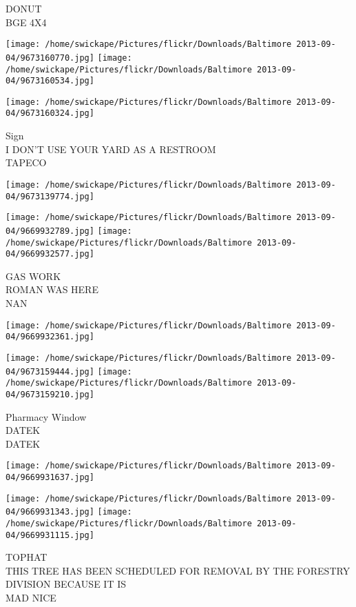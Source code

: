 \documentclass[10pt,letterpaper]{article}
\begin{document}
DONUT\\
BGE 4X4
\pagebreak

\texttt{[image: /home/swickape/Pictures/flickr/Downloads/Baltimore 2013-09-04/9673160770.jpg]}
\texttt{[image: /home/swickape/Pictures/flickr/Downloads/Baltimore 2013-09-04/9673160534.jpg]}

\vspace{0.25in}
\texttt{[image: /home/swickape/Pictures/flickr/Downloads/Baltimore 2013-09-04/9673160324.jpg]}

Sign\\
I DON'T USE YOUR YARD AS A RESTROOM\\
TAPECO
\pagebreak

\texttt{[image: /home/swickape/Pictures/flickr/Downloads/Baltimore 2013-09-04/9673139774.jpg]}

\vspace{0.25in}
\texttt{[image: /home/swickape/Pictures/flickr/Downloads/Baltimore 2013-09-04/9669932789.jpg]}
\texttt{[image: /home/swickape/Pictures/flickr/Downloads/Baltimore 2013-09-04/9669932577.jpg]}

GAS WORK\\
ROMAN WAS HERE\\
NAN
\pagebreak

\texttt{[image: /home/swickape/Pictures/flickr/Downloads/Baltimore 2013-09-04/9669932361.jpg]}

\vspace{0.25in}
\texttt{[image: /home/swickape/Pictures/flickr/Downloads/Baltimore 2013-09-04/9673159444.jpg]}
\texttt{[image: /home/swickape/Pictures/flickr/Downloads/Baltimore 2013-09-04/9673159210.jpg]}

Pharmacy Window\\
DATEK\\
DATEK
\pagebreak

\texttt{[image: /home/swickape/Pictures/flickr/Downloads/Baltimore 2013-09-04/9669931637.jpg]}

\vspace{0.25in}
\texttt{[image: /home/swickape/Pictures/flickr/Downloads/Baltimore 2013-09-04/9669931343.jpg]}
\texttt{[image: /home/swickape/Pictures/flickr/Downloads/Baltimore 2013-09-04/9669931115.jpg]}

TOPHAT\\
THIS TREE HAS BEEN SCHEDULED FOR REMOVAL BY THE FORESTRY DIVISION BECAUSE IT IS\\
MAD NICE
\pagebreak
\end{document}
